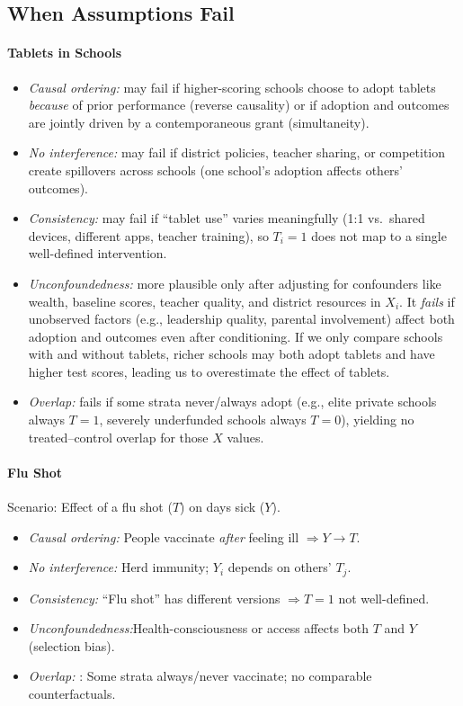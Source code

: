 \documentclass[11pt]{exam}
\theoremstyle{plain}
\begin{document}
\subsection{When Assumptions Fail}

\paragraph{Tablets in Schools}
\begin{itemize}[leftmargin=*]
  \item \emph{Causal ordering:} may fail if higher-scoring schools choose to adopt tablets \emph{because} of prior performance (reverse causality) or if adoption and outcomes are jointly driven by a contemporaneous grant (simultaneity).
  \item \emph{No interference:} may fail if district policies, teacher sharing, or competition create spillovers across schools (one school’s adoption affects others’ outcomes).
  \item \emph{Consistency:} may fail if “tablet use” varies meaningfully (1:1 vs.\ shared devices, different apps, teacher training), so $T_i=1$ does not map to a single well-defined intervention.
  \item \emph{Unconfoundedness:} more plausible only after adjusting for confounders like wealth, baseline scores, teacher quality, and district resources in $X_i$. It \emph{fails} if unobserved factors (e.g., leadership quality, parental involvement) affect both adoption and outcomes even after conditioning. If we only compare schools with and without tablets, richer schools may both adopt tablets and have higher test scores, leading us to overestimate the effect of tablets.
  \item \emph{Overlap:} fails if some strata never/always adopt (e.g., elite private schools always $T=1$, severely underfunded schools always $T=0$), yielding no treated–control overlap for those $X$ values.
\end{itemize}

\paragraph{Flu Shot}
Scenario: Effect of a flu shot ($T$) on days sick ($Y$).

\begin{itemize}[leftmargin=*]
  \item \emph{Causal ordering:} People vaccinate \emph{after} feeling ill $\Rightarrow Y \to T$.
  \item \emph{No interference:} Herd immunity; $Y_i$ depends on others’ $T_j$.
  \item \emph{Consistency:} “Flu shot” has different versions $\Rightarrow T{=}1$ not well-defined.
  \item \emph{Unconfoundedness:}Health-consciousness or access affects both $T$ and $Y$ (selection bias).
  \item \emph{Overlap:} : Some strata always/never vaccinate; no comparable counterfactuals.
\end{itemize}
\end{document}

